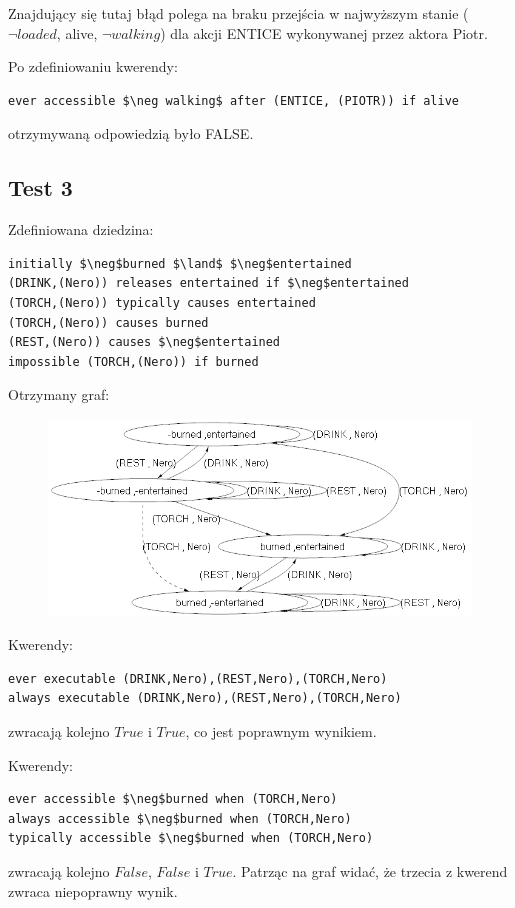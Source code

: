 \documentclass{article}
\begin{document}
Znajdujący się tutaj błąd polega na braku przejścia w najwyższym stanie ($\neg loaded$, alive, $\neg walking$) dla akcji ENTICE wykonywanej przez aktora Piotr.

Po zdefiniowaniu kwerendy:
\begin{lstlisting}[mathescape=true]
ever accessible $\neg walking$ after (ENTICE, (PIOTR)) if alive
\end{lstlisting}

otrzymywaną odpowiedzią było FALSE.

\newpage

\subsection{Test 3}
Zdefiniowana dziedzina:
\bigskip
{}
\begin{lstlisting}[mathescape=true]
initially $\neg$burned $\land$ $\neg$entertained
(DRINK,(Nero)) releases entertained if $\neg$entertained
(TORCH,(Nero)) typically causes entertained
(TORCH,(Nero)) causes burned
(REST,(Nero)) causes $\neg$entertained
impossible (TORCH,(Nero)) if burned
\end{lstlisting}
\vspace{1cm}

Otrzymany graf:
\begin{figure}[H]
	\centering
	\includegraphics[scale=0.6]{test3_graf}
\end{figure}

Kwerendy:
\begin{lstlisting}[mathescape=true]
ever executable (DRINK,Nero),(REST,Nero),(TORCH,Nero)
always executable (DRINK,Nero),(REST,Nero),(TORCH,Nero)
\end{lstlisting}
zwracają kolejno $True$ i $True$, co jest poprawnym wynikiem.
\vspace{0.2cm}

Kwerendy:
\begin{lstlisting}[mathescape=true]
ever accessible $\neg$burned when (TORCH,Nero)
always accessible $\neg$burned when (TORCH,Nero)
typically accessible $\neg$burned when (TORCH,Nero)
\end{lstlisting}
zwracają kolejno $False$, $False$ i $True$. Patrząc na graf widać, że trzecia z kwerend zwraca niepoprawny wynik.
\end{document}
